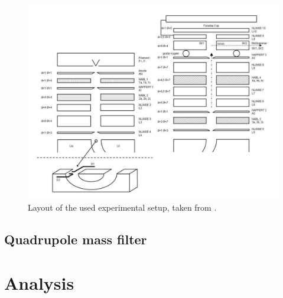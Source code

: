 \documentclass[a4paper,10pt]{article}
\begin{document}
\begin{figure}[H]
	\centering
	\includegraphics[width = 1 \textwidth]{setup.png}
	\caption{Layout of the used experimental setup, taken from \cite{script}. }
	\label{setup}
\end{figure}

\subsection{Quadrupole mass filter}
\section{Analysis}
\end{document}
